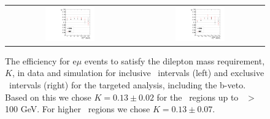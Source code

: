 \begin{figure}[!hb]
\begin{center}
\begin{tabular}{cc}
\includegraphics[width=0.4\textwidth]{plots/extractK_inclusive_bveto_19p5fb.pdf} &
\includegraphics[width=0.4\textwidth]{plots/extractK_exclusive_bveto_19p5fb.pdf} \\
\end{tabular}
\caption{
The efficiency for e$\mu$ events to satisfy the dilepton mass requirement, $K$, in data and simulation for inclusive \MET\ intervals (left) and
exclusive \MET\ intervals (right) for the targeted analysis, including the b-veto. 
Based on this we chose $K=0.13\pm0.02$ for the \MET\ regions up to \MET\ $>$ 100 GeV.
For higher \MET\ regions we chose $K=0.13\pm0.07$.
\label{fig:K_targeted}
}

\end{center}
\end{figure}
